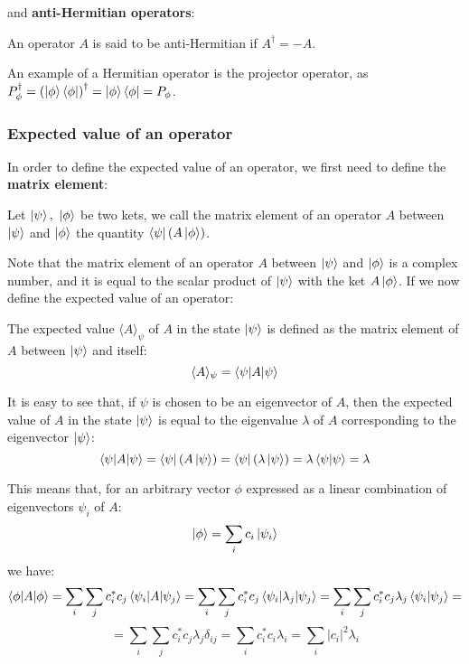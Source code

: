 and \textbf{anti-Hermitian operators}:
\begin{definition}
    An operator $A$ is said to be anti-Hermitian if $A^\dagger = -A$.
\end{definition}

An example of a Hermitian operator is the projector operator, as $P_\phi^\dagger = \left(\ket{\phi}\bra{\phi}\right)^\dagger = \ket{\phi}\bra{\phi} = P_\phi$.

\subsubsection{Expected value of an operator}

In order to define the expected value of an operator, we first need to define the \textbf{matrix element}:

\begin{definition}
    Let $\ket{\psi}, \ \ket{\phi}$ be two kets, we call the matrix element of an operator $A$ between $\ket{\psi}$ and $\ket{\phi}$ the quantity $\bra{\psi}(A\ket{\phi})$. 
\end{definition}

Note that the matrix element of an operator $A$ between $\ket{\psi}$ and $\ket{\phi}$ is a complex number, and it is equal to the scalar product of $\ket{\psi}$ with the ket $A\ket{\phi}$. If we now define the expected value of an operator:

\begin{definition}
    The expected value $\langle A \rangle_\psi$ of $A$ in the state $\ket{\psi}$ is defined as the matrix element of $A$ between $\ket{\psi}$ and itself:
    \begin{equation}
        \langle A \rangle_\psi = \braket{\psi|A|\psi}
    \end{equation}
\end{definition}

It is easy to see that, if $\psi$ is chosen to be an eigenvector of $A$, then the expected value of $A$ in the state $\ket{\psi}$ is equal to the eigenvalue $\lambda$ of $A$ corresponding to the eigenvector $\ket{\psi}$:
\begin{equation}
    \braket{\psi|A|\psi} = \bra{\psi} (A \ket{\psi}) = \bra{\psi} (\lambda \ket{\psi}) = \lambda\braket{\psi|\psi} = \lambda
\end{equation}

This means that, for an arbitrary vector $\phi$ expressed as a linear combination of eigenvectors $\psi_i$ of $A$:
\begin{equation}
    \ket{\phi} = \sum_i c_i\ket{\psi_i}
\end{equation}
we have:
\begin{equation*}
    \braket{\phi|A|\phi} = \sum_i\sum_j c_i^*c_j\braket{\psi_i|A|\psi_j} = \sum_i\sum_j c_i^*c_j\braket{\psi_i|\lambda_j|\psi_j} = \sum_i\sum_j c_i^*c_j\lambda_j\braket{\psi_i|\psi_j} = 
\end{equation*}
\begin{equation} \label{expected_value}
    = \sum_i\sum_j c_i^*c_j\lambda_j\delta_{ij} = \sum_i c_i^*c_i\lambda_i = \sum_i |c_i|^2\lambda_i
\end{equation}


